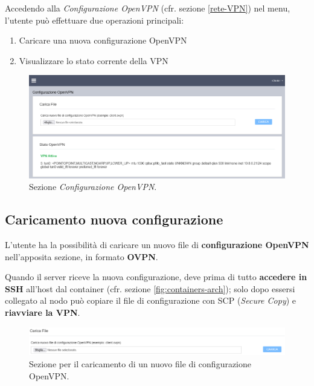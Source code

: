 Accedendo alla \emph{Configurazione OpenVPN} (cfr. sezione \ref{rete-VPN}) nel menu, l'utente può effettuare due operazioni principali:

\begin{enumerate}
    \item Caricare una nuova configurazione OpenVPN
    \item Visualizzare lo stato corrente della VPN
\end{enumerate}

\begin{figure}[H]
    \begin{center}
    \includegraphics[width=\textwidth]{images/full-vpn.png}
    \caption{Sezione \emph{Configurazione OpenVPN}.}
    \end{center}
\end{figure}

\subsection{Caricamento nuova configurazione}

L'utente ha la possibilità di caricare un nuovo file di \textbf{configurazione OpenVPN} nell'apposita sezione, in formato \textbf{OVPN}. 

Quando il server riceve la nuova configurazione, deve prima di tutto \textbf{accedere in SSH} all'host dal container (cfr. sezione \ref{fig:containers-arch}); solo dopo essersi collegato al nodo può copiare il file di configurazione con SCP (\emph{Secure Copy}) e \textbf{riavviare la VPN}.

\begin{figure}[H]
    \begin{center}
    \includegraphics[width=\textwidth]{images/vpn-file.png}
    \caption{Sezione per il caricamento di un nuovo file di configurazione OpenVPN.}
    \end{center}
\end{figure}

